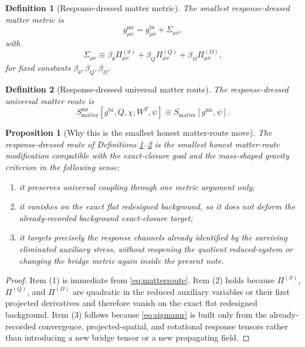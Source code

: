 \documentclass[11pt]{article}
\newcommand{\PiTheta}{\Pi^{(\vartheta)}}
\newcommand{\PiQ}{\Pi^{(Q)}}
\newcommand{\PiOmega}{\Pi^{(\Omega)}}
\newcommand{\MatterMetric}{g^{\mathrm{mr}}}
\newcommand{\SigmaMR}{\Sigma}
\newtheorem{definition}{Definition}
\newtheorem{proposition}{Proposition}
\begin{document}
\begin{definition}[Response-dressed matter metric]
\label{def:mmetric}
The \emph{smallest response-dressed matter metric} is
\begin{equation}
\MatterMetric_{\mu\nu}
=
g_{\mu\nu}^{\mathrm{br}}+\SigmaMR_{\mu\nu},
\label{eq:gmr}
\end{equation}
with
\begin{equation}
\SigmaMR_{\mu\nu}
\equiv
\beta_\theta \PiTheta_{\mu\nu}
+\beta_Q \PiQ_{\mu\nu}
+\beta_\Omega \PiOmega_{\mu\nu},
\label{eq:sigmamr}
\end{equation}
for fixed constants \(\beta_\theta,\beta_Q,\beta_\Omega\).
\end{definition}

\begin{definition}[Response-dressed universal matter route]
\label{def:matterroute}
The \emph{response-dressed universal matter route} is
\begin{equation}
S_{\mathrm{matter}}^{\mathrm{mr}}[g^{\mathrm{br}},Q,\chi,W^T,\psi]
\equiv
S_{\mathrm{matter}}[\MatterMetric,\psi].
\label{eq:matterroute}
\end{equation}
\end{definition}

\begin{proposition}[Why this is the smallest honest matter-route move]
\label{prop:smallest}
The response-dressed route of Definitions \ref{def:mmetric}--\ref{def:matterroute} is the smallest honest matter-route modification compatible with the exact-closure goal and the mass-shaped gravity criterion in the following sense:
\begin{enumerate}
    \item it preserves universal coupling through one metric argument only;
    \item it vanishes on the exact flat redesigned background, so it does not deform the already-recorded background exact-closure target;
    \item it targets precisely the response channels already identified by the surviving eliminated auxiliary stress, without reopening the quotient reduced-system or changing the bridge metric again inside the present note.
\end{enumerate}
\end{proposition}

\begin{proof}
Item (1) is immediate from \eqref{eq:matterroute}. Item (2) holds because \(\PiTheta\), \(\PiQ\), and \(\PiOmega\) are quadratic in the reduced auxiliary variables or their first projected derivatives and therefore vanish on the exact flat redesigned background. Item (3) follows because \eqref{eq:sigmamr} is built only from the already-recorded convergence, projected-spatial, and rotational response tensors rather than introducing a new bridge tensor or a new propagating field.
\end{proof}
\end{document}
